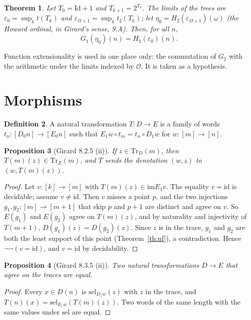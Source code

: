 \documentclass[11pt,a4paper]{article}
\newtheorem{theorem}{Theorem}[section]
\newtheorem{proposition}[theorem]{Proposition}
\theoremstyle{definition}
\newtheorem{definition}[theorem]{Definition}
\theoremstyle{remark}
\newcommand{\Tr}{\mathrm{Tr}}
\newcommand{\sel}{\mathrm{sel}}
\newcommand{\im}{\mathrm{im}}
\newcommand{\id}{\mathrm{id}}
\begin{document}
\begin{theorem}
Let $T_0 = \mathrm{Id} + 1$ and $T_{k+1} = 2^{T_k}$. The limits of the
trees are $\varepsilon_0 = \sup_k t(T_k)$ and $\varepsilon_{\Omega+1} =
\sup_k t_2(T_k)$; let $\eta_0 = H_2(\varepsilon_{\Omega+1})(\omega)$ (the
Howard ordinal, in Girard's sense, 9.A). Then, for all $n$,
\[
G_1(\eta_0)(n) = H_1(\varepsilon_0)(n).
\]
\end{theorem}

Function extensionality is used in one place only: the commutation of
$G_2$ with the arithmetic under the limits indexed by $\mathcal O$. It is
taken as a hypothesis.

\section{Morphisms}

\begin{definition}
A natural transformation $T : D \to E$ is a family of words
$t_n : [D_0 n] \to [E_0 n]$ such that $E_1 w \circ t_m = t_n \circ D_1 w$
for $w : [m] \to [n]$.
\end{definition}

\begin{proposition}[Girard 8.2.5 (ii)]
If $z \in \Tr_D(m)$, then $T(m)(z) \in \Tr_E(m)$, and $T$ sends the
denotation $(w, z)$ to $(w, T(m)(z))$.
\end{proposition}

\begin{proof}
Let $v : [k] \to [m]$ with $T(m)(z) \in \im E_1 v$. The equality $v = \id$
is decidable; assume $v \neq \id$. Then $v$ misses a point $p$, and the two
injections $g_1, g_2 : [m] \to [m+1]$ that skip $p$ and $p+1$ are distinct
and agree on $v$. So $E(g_1)$ and $E(g_2)$ agree on $T(m)(z)$, and by
naturality and injectivity of $T(m+1)$, $D(g_1)(z) = D(g_2)(z)$. Since $z$
is in the trace, $g_1$ and $g_2$ are both the least support of this point
(Theorem~\ref{th:nf}), a contradiction. Hence $\neg\neg(v = \id)$, and
$v = \id$ by decidability.
\end{proof}

\begin{proposition}[Girard 8.3.5 (ii)]
Two natural transformations $D \to E$ that agree on the traces are equal.
\end{proposition}

\begin{proof}
Every $x \in D(n)$ is $\sel_{D_1 w}(z)$ with $z$ in the trace, and
$T(n)(x) = \sel_{E_1 w}(T(m)(z))$. Two words of the same length with the
same values under $\sel$ are equal.
\end{proof}
\end{document}

